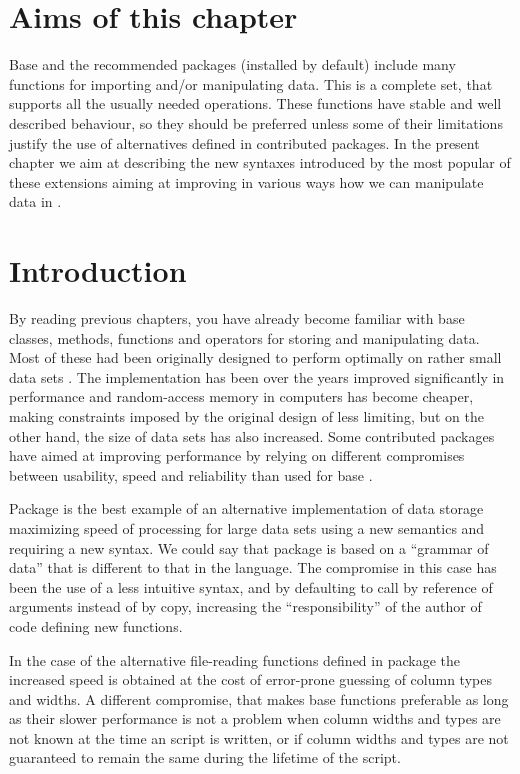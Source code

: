 \documentclass[krantz2]{krantz}\usepackage{knitr}%
\begin{document}
\section{Aims of this chapter}

Base \Rlang and the recommended packages (installed by default) include many functions for importing and/or manipulating data. This is a complete set, that supports all the usually needed operations. These functions have stable and well described behaviour, so they should be preferred unless some of their limitations justify the use of alternatives defined in contributed packages. In the present chapter we aim at describing the new syntaxes introduced by the most popular of these extensions aiming at improving in various ways how we can manipulate data in \Rlang.

\section{Introduction}

By reading previous chapters, you have already become familiar with base \Rlang classes, methods, functions and operators for storing and manipulating data. Most of these had been originally designed to perform optimally on rather small data sets \autocite[see][]{Matloff2011}. The \Rlang implementation has been over the years improved significantly in performance and random-access memory in computers has become cheaper, making constraints imposed by the original design of \Rlang less limiting, but on the other hand, the size of data sets has also increased. Some contributed packages have aimed at improving performance by relying on different compromises between usability, speed and reliability than used for base \Rlang.

Package  is the best example of an alternative implementation of data storage maximizing speed of processing for large data sets using a new semantics and requiring a new syntax. We could say that package  is based on a ``grammar of data'' that is different to that in the \Rlang language. The compromise in this case has been the use of a less intuitive syntax, and by defaulting to call by reference of arguments instead of by copy, increasing the ``responsibility'' of the author of code defining new functions.

In the case of the alternative file-reading functions defined in package  the increased speed is obtained at the cost of error-prone guessing of column types and widths. A different compromise, that makes base \Rlang functions preferable as long as their slower performance is not a problem when column widths and types are not known at the time an script is written, or if column widths and types are not guaranteed to remain the same during the lifetime of the script.
\end{document}
